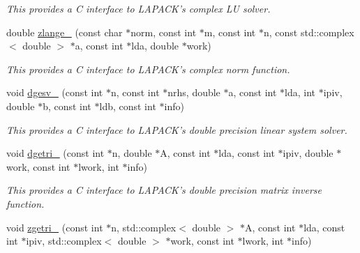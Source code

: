 \begin{DoxyCompactItemize}
\begin{DoxyCompactList}\small\item\em This provides a C interface to L\-A\-P\-A\-C\-K's complex L\-U solver. \end{DoxyCompactList}\item 
\hypertarget{namespacekeycpp_a1477c910b07baef984fe8528c29b2774}{double \hyperlink{namespacekeycpp_a1477c910b07baef984fe8528c29b2774}{zlange\-\_\-} (const char $\ast$norm, const int $\ast$m, const int $\ast$n, const std\-::complex$<$ double $>$ $\ast$a, const int $\ast$lda, double $\ast$work)}\label{namespacekeycpp_a1477c910b07baef984fe8528c29b2774}

\begin{DoxyCompactList}\small\item\em This provides a C interface to L\-A\-P\-A\-C\-K's complex norm function. \end{DoxyCompactList}\item 
\hypertarget{namespacekeycpp_a12719f4b48de048f9642066666a920bd}{void \hyperlink{namespacekeycpp_a12719f4b48de048f9642066666a920bd}{dgesv\-\_\-} (const int $\ast$n, const int $\ast$nrhs, double $\ast$a, const int $\ast$lda, int $\ast$ipiv, double $\ast$b, const int $\ast$ldb, const int $\ast$info)}\label{namespacekeycpp_a12719f4b48de048f9642066666a920bd}

\begin{DoxyCompactList}\small\item\em This provides a C interface to L\-A\-P\-A\-C\-K's double precision linear system solver. \end{DoxyCompactList}\item 
\hypertarget{namespacekeycpp_af92d0d887ae48cc4222f7167232a7f82}{void \hyperlink{namespacekeycpp_af92d0d887ae48cc4222f7167232a7f82}{dgetri\-\_\-} (const int $\ast$n, double $\ast$A, const int $\ast$lda, const int $\ast$ipiv, double $\ast$work, const int $\ast$lwork, int $\ast$info)}\label{namespacekeycpp_af92d0d887ae48cc4222f7167232a7f82}

\begin{DoxyCompactList}\small\item\em This provides a C interface to L\-A\-P\-A\-C\-K's double precision matrix inverse function. \end{DoxyCompactList}\item 
\hypertarget{namespacekeycpp_a4190e125fe33133aafa586089ca6e174}{void \hyperlink{namespacekeycpp_a4190e125fe33133aafa586089ca6e174}{zgetri\-\_\-} (const int $\ast$n, std\-::complex$<$ double $>$ $\ast$A, const int $\ast$lda, const int $\ast$ipiv, std\-::complex$<$ double $>$ $\ast$work, const int $\ast$lwork, int $\ast$info)}\label{namespacekeycpp_a4190e125fe33133aafa586089ca6e174}


\end{DoxyCompactItemize}
